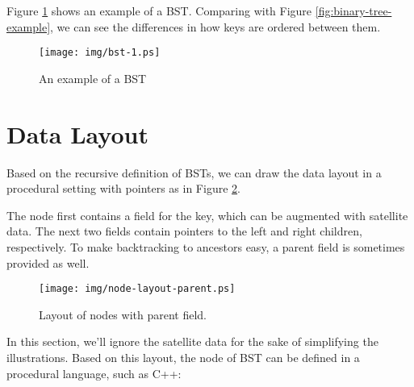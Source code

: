 \documentclass[UTF8]{article}
\begin{document}
Figure \ref{fig:bst-example} shows an example of a BST. Comparing with
Figure \ref{fig:binary-tree-example}, we can see the differences in how keys are
ordered between them.

\begin{figure}[htbp]
       \begin{center}
        \texttt{[image: img/bst-1.ps]}
        \caption{An example of a BST} \label{fig:bst-example}
       \end{center}
\end{figure}


\section{Data Layout}

Based on the recursive definition of BSTs, we can draw the
data layout in a procedural setting with pointers as in Figure
\ref{fig:node-layout-parent}.


The node first contains a field for the key, which can be augmented with satellite
data. The next two fields contain pointers to the left and right children, respectively. To make backtracking to ancestors easy, a parent field is sometimes provided as well.

\begin{figure}[htbp]
       \begin{center}
        \texttt{[image: img/node-layout-parent.ps]}
        \caption{Layout of nodes with parent field.} \label{fig:node-layout-parent}
       \end{center}
\end{figure}

In this section, we'll ignore the satellite data for the sake of simplifying the illustrations. Based on this layout, the node of BST can be defined in a procedural language, such as C++:
\end{document}
